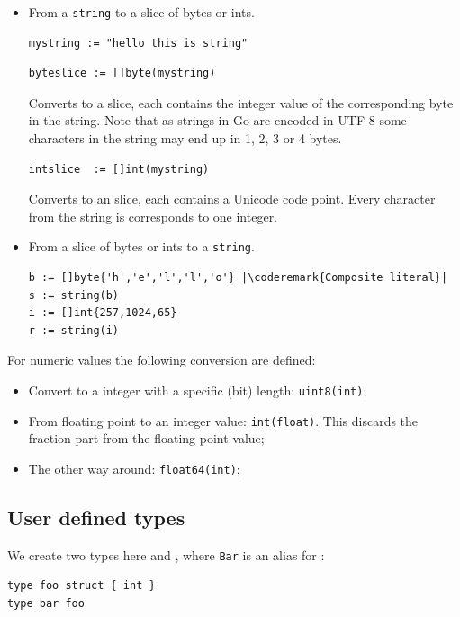 \begin{table}[H]
\begin{center}
\caption[Valid conversions]{Valid conversions, \lstinline{float64} works the same as \lstinline{float32}}
\label{tab:convesion}

\end{center}
\end{table}

\begin{itemize}
\item{
From a \lstinline{string} to a slice of bytes or ints.
\begin{lstlisting}
mystring := "hello this is string"
\end{lstlisting}

\begin{lstlisting}
byteslice := []byte(mystring)
\end{lstlisting}
Converts to a  slice, each  contains the integer value
of the corresponding byte in the string. Note that as strings in Go
are encoded in UTF-8 some characters in the string may end up in 1, 2, 3
or 4 bytes.
\begin{lstlisting}
intslice  := []int(mystring)
\end{lstlisting}
Converts to an  slice, each  contains a Unicode code
point. Every character from the string is corresponds to one integer.
}
\item{
From a slice of bytes or ints to a \lstinline{string}.
\begin{lstlisting}
b := []byte{'h','e','l','l','o'} |\coderemark{Composite literal}|
s := string(b)
i := []int{257,1024,65} 
r := string(i)
\end{lstlisting}
}
\end{itemize}
For numeric values the following conversion are defined:
\begin{itemize}
\item{Convert to a integer with a specific (bit) length: 
\lstinline{uint8(int)};}
\item{From floating point to an integer value: 
\lstinline{int(float)}. This discards the fraction part
from the floating point value;}
\item{The other way around: \lstinline{float64(int)};}
\end{itemize}

\subsection{User defined types}
We create two types here  and , where
\lstinline{Bar} is an alias for :
\begin{lstlisting}
type foo struct { int } 
type bar foo
\end{lstlisting}

